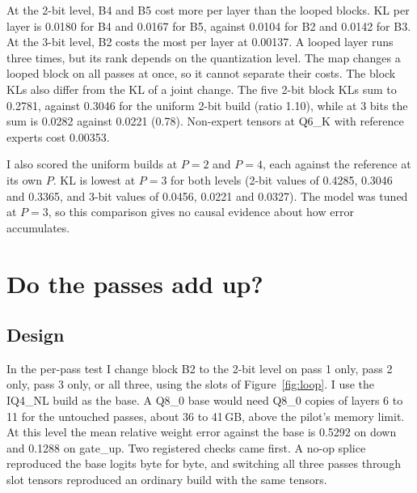 \documentclass[11pt,a4paper]{article}
\begin{document}
At the 2-bit level, B4 and B5 cost more per layer than the looped blocks. KL per layer is 0.0180 for B4 and 0.0167 for B5, against 0.0104 for B2 and 0.0142 for B3. At the 3-bit level, B2 costs the most per layer at 0.00137. A looped layer runs three times, but its rank depends on the quantization level. The map changes a looped block on all passes at once, so it cannot separate their costs. The block KLs also differ from the KL of a joint change. The five 2-bit block KLs sum to 0.2781, against 0.3046 for the uniform 2-bit build (ratio 1.10), while at 3 bits the sum is 0.0282 against 0.0221 (0.78). Non-expert tensors at Q6\_K with reference experts cost 0.00353.

I also scored the uniform builds at $P = 2$ and $P = 4$, each against the reference at its own $P$. KL is lowest at $P = 3$ for both levels (2-bit values of 0.4285, 0.3046 and 0.3365, and 3-bit values of 0.0456, 0.0221 and 0.0327). The model was tuned at $P = 3$, so this comparison gives no causal evidence about how error accumulates.

\section{Do the passes add up?}
\label{sec:perpass}

\subsection{Design}

In the per-pass test I change block B2 to the 2-bit level on pass 1 only, pass 2 only, pass 3 only, or all three, using the slots of Figure~\ref{fig:loop}. I use the IQ4\_NL build as the base. A Q8\_0 base would need Q8\_0 copies of layers 6 to 11 for the untouched passes, about 36 to 41\,GB, above the pilot's memory limit. At this level the mean relative weight error against the base is 0.5292 on down and 0.1288 on gate\_up. Two registered checks came first. A no-op splice reproduced the base logits byte for byte, and switching all three passes through slot tensors reproduced an ordinary build with the same tensors.
\end{document}
